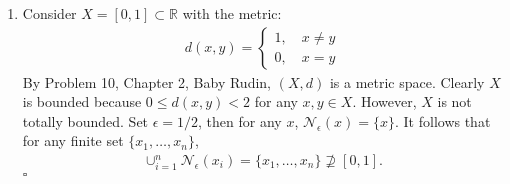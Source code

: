 \documentclass[11pt]{article}
\begin{document}
\begin{enumerate}
	\item 
%	
	Consider $X = [0,1]\subset \mathbb{R}$ with the metric:
	\begin{align*}
	d(x,y) = \begin{cases}
	1, \quad x\neq y\\
	0, \quad x = y
	\end{cases}
	\end{align*}
	By Problem 10, Chapter 2, Baby Rudin, $(X,d)$ is a metric space. Clearly $X$ is bounded because $0 \leq d(x,y) < 2$ for any $x,y\in X$. However, $X$ is not totally bounded. Set $\epsilon = 1/2$, then for any $x$, $\mathcal{N}_\epsilon(x) = \{x\}$. It follows that for any finite set $\{x_1,\dots,x_n\}$,
	\begin{align*}
	\cup^n_{i=1}\mathcal{N}_\epsilon(x_i) = \{ x_1,\dots,x_n\} \not\supseteq [0,1].
	\end{align*}
	\hfill $\square$


\end{enumerate}
\end{document}
